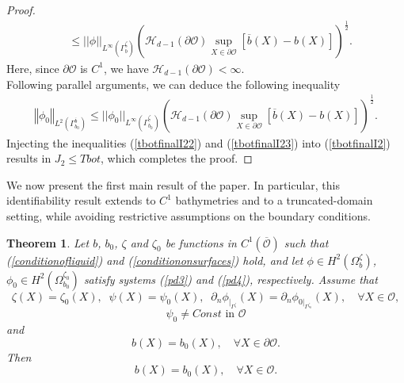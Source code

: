 \documentclass[11pt]{article}
\newtheorem{theorem}{Theorem}
\begin{document}
\begin{proof}
\begin{equation}
\begin{split}
			&\leq||\phi||_{L^{\infty}(\Gamma_{b}^{\underline{\zeta}})} \left( \mathcal{H}_{d-1} (\partial \mathcal O)  \sup_{X\in \partial \mathcal O} [\overline{b}(X)-b(X)]\right)^{\frac{1}{2}}.
		\end{split}
	\end{equation}
     Here, since $\partial \mathcal O$ is $C^{1}$, we have $\mathcal H_{d-1}(\partial \mathcal O)<\infty$.\\
	Following  parallel arguments, we can deduce the following inequality
	\begin{equation}\label{tbotfinalI23}
		\begin{split}
			\left\Vert \phi_0\right\Vert_{L^{2}(\Gamma_{b_0}^{\overline{b}} )}\leq ||\phi_0||_{L^{\infty}(\Gamma_{b_0}^{\underline{\zeta}})}
			\left( \mathcal{H}_{d-1} (\partial \mathcal O)  \sup_{X\in \partial \mathcal O} [\overline{b}(X)-b(X)]\right)^{\frac{1}{2}}. 
		\end{split}
	\end{equation}
	Injecting the inequalities (\ref{tbotfinalI22}) and (\ref{tbotfinalI23}) into (\ref{tbotfinalI2}) results in $J_2\leq Tbot$, which completes the proof.
\end{proof}

We now present the first main result of the paper. In particular, this identifiability result extends \cite{fontelos2017bottom} to $C^{1}$ bathymetries and to a truncated-domain setting, while avoiding restrictive assumptions on the boundary conditions.


\begin{theorem}\label{uniqtheorem}
	Let $b$, $b_0$, $\zeta$ and $\zeta_0$ be functions in $C^1\left(\overline{\mathcal O}\right)$ such that (\ref{conditionofliquid}) and (\ref{conditiononsurfaces}) hold, and  let $\phi\in H^2(\Omega^{\zeta}_{b})$, $\phi_0\in H^2(\Omega^{\zeta_0}_{b_0})$ satisfy systems (\ref{pd3}) and (\ref{pd4}), respectively. Assume that
	\begin{equation}\label{conditioninsurface}
		\zeta(X)=\zeta_0(X),\;\; \psi(X)=\psi_0(X),\;\; \partial_n\phi_{|_{\Gamma^{\zeta}}}(X)=\partial_n\phi_{0|_{\Gamma^{\zeta_0}}}(X),\quad \forall X\in \mathcal O,
	\end{equation}
	\begin{equation}
		\label{nonconstant}
		\psi _0\ne Const \textrm { in } { \mathcal O}
	\end{equation}
	and 
	\begin{equation}\label{conditiononbottom}
		b(X)=b_0(X),\quad \forall X\in \partial \mathcal O . 
	\end{equation}
	Then
	$$b(X)=b_0(X),\quad\forall X\in \mathcal O .$$
	
\end{theorem}
\end{document}
